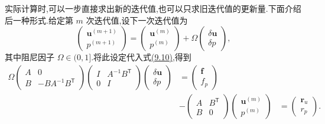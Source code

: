\begin{example}
实际计算时,可以一步直接求出新的迭代值,也可以只求旧迭代值的更新量.下面介绍后一种形式.给定第 $m$ 次迭代值,设下一次迭代值为
\begin{equation}\label{eq:chapter9-simple-update}
\begin{pmatrix}\bm u^{(m+1)}\\p^{(m+1)}\end{pmatrix}
=
\begin{pmatrix}\bm u^{(m)}\\p^{(m)}\end{pmatrix}
+\Omega\begin{pmatrix}\delta\bm u\\\delta p\end{pmatrix},
\end{equation}
其中阻尼因子 $\Omega\in(0,1]$.将此设定代入式\hyperref[eq:chapter9-simple-factorization]{(9.10)},得到
\[
\begin{aligned}
\Omega
\begin{pmatrix}A&0\\B&-BA^{-1}B^{\mathsf T}\end{pmatrix}
\begin{pmatrix}I&A^{-1}B^{\mathsf T}\\0&I\end{pmatrix}
\begin{pmatrix}\delta\bm u\\\delta p\end{pmatrix}
&=\begin{pmatrix}\bm f\\f_p\end{pmatrix}\\
&-
\begin{pmatrix}A&B^{\mathsf T}\\B&0\end{pmatrix}
\begin{pmatrix}\bm u^{(m)}\\p^{(m)}\end{pmatrix}
&=\begin{pmatrix}\bm r_u\\r_p\end{pmatrix}.
\end{aligned}
\]


\end{example}
